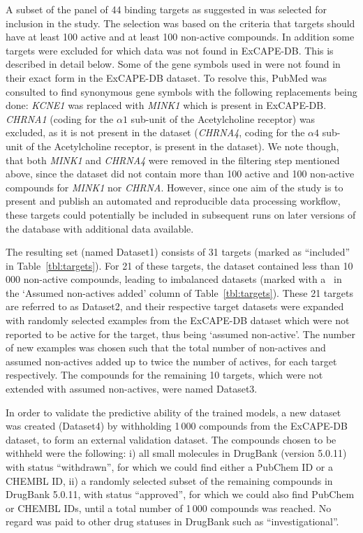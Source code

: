 \documentclass[utf8]{frontiersSCNS} %
\begin{document}
A subset of the panel of 44 binding targets as suggested in \cite{Bowes2012}
was selected for inclusion in the study. The selection was based on the
criteria that targets should have at least 100 active and at least 100
non-active compounds.  In addition some targets were excluded for which data
was not found in ExCAPE-DB. This is described in detail below.
%
Some of the gene symbols used in \cite{Bowes2012} were not found in their exact
form in the ExCAPE-DB dataset. To resolve this, PubMed was consulted to find
synonymous gene symbols with the following replacements being done:
%
\textit{KCNE1} was replaced with \textit{MINK1} which is present in ExCAPE-DB.
\textit{CHRNA1} (coding for the $\alpha1$ sub-unit of the Acetylcholine
receptor) was excluded, as it is not present in the dataset (\textit{CHRNA4},
coding for the $\alpha4$ sub-unit of the Acetylcholine receptor, is present in
the dataset). We note though, that both \textit{MINK1} and \textit{CHRNA4} were removed
in the filtering step mentioned above, since the dataset did not contain more
than 100 active and 100 non-active compounds for \textit{MINK1} nor
\textit{CHRNA}.  However, since one aim of the study is to present and publish
an automated and reproducible data processing workflow, these targets could
potentially be included in subsequent runs on later versions of the database
with additional data available.

The resulting set (named Dataset1) consists of 31 targets (marked as
``included'' in Table~\ref{tbl:targets}). For 21 of these targets, the
dataset contained less than 10\,000 non-active compounds, leading to
imbalanced datasets (marked with a \checkmark\ in the `Assumed non-actives
added' column of Table~\ref{tbl:targets}). These 21 targets are referred to
as Dataset2, and their respective target datasets were expanded with randomly
selected examples from the ExCAPE-DB dataset which were not reported to be
active for the target, thus being `assumed non-active'. The number of new
examples was chosen such that the total number of non-actives and assumed
non-actives added up to twice the number of actives, for each target
respectively. The compounds for the remaining 10 targets, which were not
extended with assumed non-actives, were named Dataset3.

In order to validate the predictive ability of the trained models, a new
dataset was created (Dataset4) by withholding 1\,000 compounds from the
ExCAPE-DB dataset, to form an external validation dataset. The compounds chosen
to be withheld were the following: i) all small molecules in DrugBank (version
5.0.11) with status ``withdrawn'', for which we could find either a PubChem ID
or a CHEMBL ID, ii) a randomly selected subset of the remaining compounds in
DrugBank 5.0.11, with status ``approved'', for which we could also find PubChem
or CHEMBL IDs, until a total number of 1\,000 compounds was reached.  No regard
was paid to other drug statuses in DrugBank such as ``investigational''.
\end{document}
